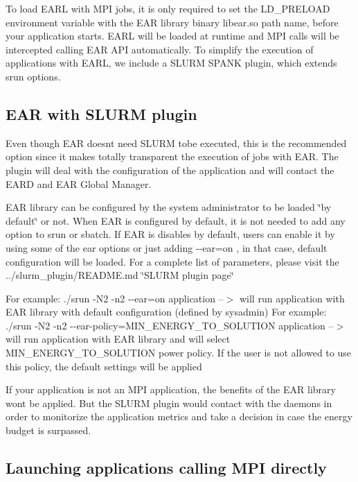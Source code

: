 To load E\+A\+RL with M\+PI jobs, it is only required to set the L\+D\+\_\+\+P\+R\+E\+L\+O\+AD environment variable with the E\+AR library binary \textquotesingle{}libear.\+so\textquotesingle{} path name, before your application starts. E\+A\+RL will be loaded at runtime and M\+PI calls will be intercepted calling E\+AR A\+PI automatically. To simplify the execution of applications with E\+A\+RL, we include a S\+L\+U\+RM S\+P\+A\+NK plugin, which extends srun options.

\subsection*{E\+AR with S\+L\+U\+RM plugin }

Even though E\+AR doesn\textquotesingle{}t need S\+L\+U\+RM tobe executed, this is the recommended option since it makes totally transparent the execution of jobs with E\+AR. The plugin will deal with the configuration of the application and will contact the E\+A\+RD and E\+AR Global Manager.

E\+AR library can be configured by the system administrator to be loaded \char`\"{}by default\char`\"{} or not. When E\+AR is configured by default, it is not needed to add any option to srun or sbatch. If E\+AR is disables by default, users can enable it by using some of the ear options or just adding {\ttfamily -\/-\/ear=on} , in that case, default configuration will be loaded. For a complete list of parameters, please visit the ../slurm\+\_\+plugin/\+R\+E\+A\+D\+ME.md \char`\"{}\+S\+L\+U\+R\+M plugin page\char`\"{}

For example\+: {\ttfamily ./srun -\/\+N2 -\/n2 -\/-\/ear=on application} --$>$ will run application with E\+AR library with default configuration (defined by sysadmin) For example\+: {\ttfamily ./srun -\/\+N2 -\/n2 -\/-\/ear-\/policy=M\+I\+N\+\_\+\+E\+N\+E\+R\+G\+Y\+\_\+\+T\+O\+\_\+\+S\+O\+L\+U\+T\+I\+ON application} --$>$ will run application with E\+AR library and will select M\+I\+N\+\_\+\+E\+N\+E\+R\+G\+Y\+\_\+\+T\+O\+\_\+\+S\+O\+L\+U\+T\+I\+ON power policy. If the user is not allowed to use this policy, the default settings will be applied

If your application is not an M\+PI application, the benefits of the E\+AR library won\textquotesingle{}t be applied. But the S\+L\+U\+RM plugin would contact with the daemons in order to monitorize the application metrics and take a decision in case the energy budget is surpassed.

\subsection*{Launching applications calling M\+PI directly }


